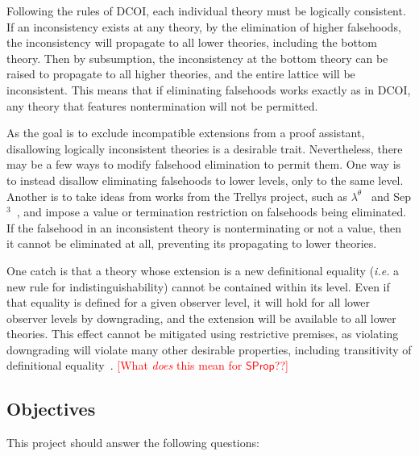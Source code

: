\documentclass{article}
\makeatletter
\newcommand{\note}[1]{\textcolor{red}{[#1]}}
\newcommand{\ie}{\textit{i.e.}\@\xspace}
\newcommand{\kw}[1]{\mathsf{#1}}
\makeatother
\begin{document}
Following the rules of DCOI,
each individual theory must be logically consistent.
If an inconsistency exists at any theory,
by the elimination of higher falsehoods,
the inconsistency will propagate to all lower theories, including the bottom theory.
Then by subsumption, the inconsistency at the bottom theory
can be raised to propagate to all higher theories,
and the entire lattice will be inconsistent.
This means that if eliminating falsehoods works exactly as in DCOI,
any theory that features nontermination will not be permitted.

As the goal is to exclude incompatible extensions from a proof assistant,
disallowing logically inconsistent theories is a desirable trait.
Nevertheless, there may be a few ways to modify falsehood elimination to permit them.
One way is to instead disallow eliminating falsehoods to lower levels,
only to the same level.
Another is to take ideas from works from the Trellys project,
such as $\lambda^\theta$~\citep{lambda-theta} and Sep$^3$~\citep{sep3},
and impose a value or termination restriction on falsehoods being eliminated.
If the falsehood in an inconsistent theory is nonterminating or not a value,
then it cannot be eliminated at all,
preventing its propagating to lower theories.

One catch is that a theory whose extension is a new definitional equality
(\ie a new rule for indistinguishability) cannot be contained within its level.
Even if that equality is defined for a given observer level,
it will hold for all lower observer levels by downgrading,
and the extension will be available to all lower theories.
This effect cannot be mitigated using restrictive premises,
as violating downgrading will violate many other desirable properties,
including transitivity of definitional equality~\citep{dcoi-omega}.
\note{What \emph{does} this mean for $\kw{SProp}$??}

\subsection{Objectives}

This project should answer the following questions:
\end{document}
